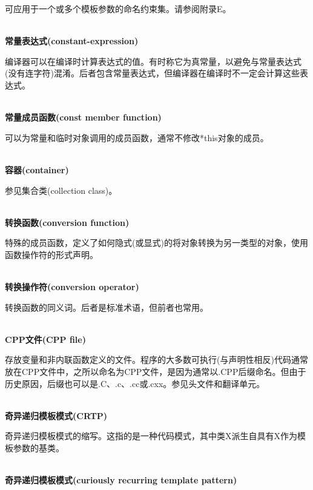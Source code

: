 可应用于一个或多个模板参数的命名约束集。请参阅附录E。

\hspace*{\fill} \\ %
\noindent
\textbf{常量表达式(constant-expression)}

编译器可以在编译时计算表达式的值。有时称它为真常量，以避免与常量表达式(没有连字符)混淆。后者包含常量表达式，但编译器在编译时不一定会计算这些表达式。

\hspace*{\fill} \\ %
\noindent
\textbf{常量成员函数(const member function)}

可以为常量和临时对象调用的成员函数，通常不修改*this对象的成员。

\hspace*{\fill} \\ %
\noindent
\textbf{容器(container)}

参见集合类(collection class)。

\hspace*{\fill} \\ %
\noindent
\textbf{转换函数(conversion function)}

特殊的成员函数，定义了如何隐式(或显式)的将对象转换为另一类型的对象，使用函数操作符的形式声明。

\hspace*{\fill} \\ %
\noindent
\textbf{转换操作符(conversion operator)}

转换函数的同义词。后者是标准术语，但前者也常用。

\hspace*{\fill} \\ %
\noindent
\textbf{CPP文件(CPP file)}

存放变量和非内联函数定义的文件。程序的大多数可执行(与声明性相反)代码通常放在CPP文件中，之所以命名为CPP文件，是因为通常以.CPP后缀命名。但由于历史原因，后缀也可以是.C、.c、.cc或.cxx。参见头文件和翻译单元。

\hspace*{\fill} \\ %
\noindent
\textbf{奇异递归模板模式(CRTP)}

奇异递归模板模式的缩写。这指的是一种代码模式，其中类X派生自具有X作为模板参数的基类。

\hspace*{\fill} \\ %
\noindent
\textbf{奇异递归模板模式(curiously recurring template pattern)}

